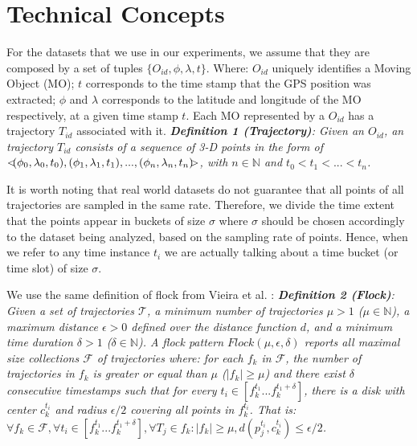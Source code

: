 \chapter{Technical Concepts}
\label{chp:techconcepts}
For the datasets that we use in our experiments, we assume that they are composed by a set of tuples $\{O_{id}, \phi,
\lambda, t\}$.  Where: $O_{id}$ uniquely identifies a Moving Object (MO); $t$ corresponds to the time stamp that the GPS
position was extracted; $\phi$ and $\lambda$ corresponds to the latitude and longitude of the MO respectively, at a
given time stamp $t$. Each MO represented by a $O_{id}$ has a trajectory $T_{id}$ associated with it.
\newline
\newline
\noindent
\textit{\textbf{Definition 1 (Trajectory)}: Given an $O_{id}$, an trajectory $T_{id}$ consists of a sequence of 3-D
points in the form of $<\hspace{-0.2cm}(\phi_0, \lambda_0, t_0), (\phi_1, \lambda_1, t_1), ..., (\phi_n, \lambda_n, t_n)
\hspace{-0.2cm}>$, with $n \in \mathbb{N}$ and $t_0 < t_1 < ... < t_n$.}
\newline
\par
It is worth noting that real world datasets do not guarantee that all points of all trajectories are sampled in the same
rate. Therefore, we divide the time extent that the points appear in buckets of size $\sigma$ where $\sigma$ should be
chosen accordingly to the dataset being analyzed, based on the sampling rate of points. Hence, when we refer to any time
instance $t_i$ we are actually talking about a time bucket (or time slot) of size $\sigma$.

We use the same definition of flock from Vieira et al. \citep{vieira}:
\newline
\newline
\noindent
\textit{\textbf{Definition 2 (Flock)}: Given a set of trajectories $\mathcal{T}$, a minimum number of trajectories $\mu
> 1$ ($\mu \in \mathbb{N}$), a maximum distance $\epsilon > 0$ defined over the distance function $d$, and a minimum
time duration $\delta > 1$ ($\delta \in \mathbb{N}$). A flock pattern $Flock (\mu, \epsilon, \delta)$ reports all
maximal size collections $\mathcal{F}$ of trajectories where: for each $f_k$ in $\mathcal{F}$, the number of
trajectories in $f_k$ is greater or equal than $\mu$ ($|f_k| \ge \mu$) and there exist $\delta$ consecutive timestamps
such that for every $t_i \in [f_k^{t_1}...f_k^{t_1 + \delta}]$, there is a disk with center $c_k^{t_i}$ and radius
$\epsilon/2$ covering all points in $f_k^{t_i}$. That is: $\forall f_k \in \mathcal{F}, \forall t_i \in
[f_k^{t_1}...f_k^{t_1 + \delta}], \forall T_j \in f_k: |f_k | \ge \mu, d(p_j^{t_i},c_k^{t_i}) \le \epsilon/2$.}
